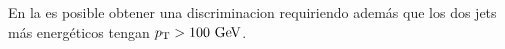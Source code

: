 

En la {\SRL} es posible obtener una discriminacion requiriendo además que los dos jets
más energéticos tengan $\pt>100 \gev$.



